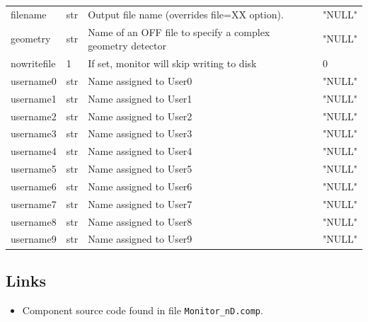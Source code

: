 \begin{longtable}{p{}p{}p{}p{}}
filename & str & Output file name (overrides file=XX option). & "NULL" \\
geometry & str & Name of an OFF file to specify a complex geometry detector & "NULL" \\
nowritefile & 1 & If set, monitor will skip writing to disk & 0 \\
username0 & str & Name assigned to User0 & "NULL" \\
username1 & str & Name assigned to User1 & "NULL" \\
username2 & str & Name assigned to User2 & "NULL" \\
username3 & str & Name assigned to User3 & "NULL" \\
username4 & str & Name assigned to User4 & "NULL" \\
username5 & str & Name assigned to User5 & "NULL" \\
username6 & str & Name assigned to User6 & "NULL" \\
username7 & str & Name assigned to User7 & "NULL" \\
username8 & str & Name assigned to User8 & "NULL" \\
username9 & str & Name assigned to User9 & "NULL" \\
\bottomrule
\end{longtable}

\subsection*{Links}
\begin{itemize}
  \item Component source code found in file \texttt{Monitor\_nD.comp}.
\end{itemize}
